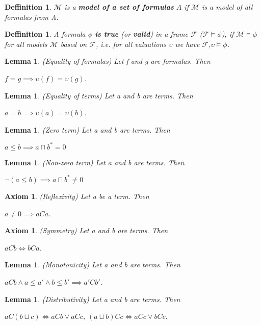 \documentclass{article}
\newcommand\M{\mathcal{M}}
\newcommand\F{\mathcal{F}}
\newtheorem{lemma}[theorem]{Lemma}
\newtheorem{axiom}[theorem]{Axiom}
\newtheorem{defn}[theorem]{Deffinition}
\begin{document}
	\begin{defn}
		$\M$ is a \textbf{model of a set of formulas} $A$ if $\M$ is a model of all formulas from A.
	\end{defn}

	\begin{defn} A formula $\phi$ \textbf{is \textit{true}} (or \textbf{valid}) in a frame $\F$ ($\F \models \phi$), if $\M \models \phi$ for all models $\M$ based on $\F$, i.e. for all valuations $\upsilon$ we have $\F$,$\upsilon \models \phi$.
	\end{defn}

	\begin{lemma}
		(Equality of formulas) Let f and g are formulas. Then \par $f = g \implies \upsilon(f) = \upsilon(g)$.
	\end{lemma}

	\begin{lemma}
		(Equality of terms) Let a and b are terms. Then \par $a = b \implies \upsilon(a) = \upsilon(b)$.
	\end{lemma}

	\begin{lemma} (Zero term) Let a and b are terms. Then \par $a \leq b \implies a \sqcap b^*=0$
	\end{lemma}

	\begin{lemma} (Non-zero term) Let a and b are terms. Then \par $\neg(a \leq b) \implies a \sqcap b^* \neq 0$
	\end{lemma}

	\begin{axiom}
		(Reflexivity) Let a be a term. Then \par $ a \neq 0 \implies aCa$.
	\end{axiom}

	\begin{axiom}
		(Symmetry) Let a and b are terms. Then \par $aCb \iff bCa$.
	\end{axiom}

	\begin{lemma}
		(Monotonicity) Let a and b are terms. Then \par $aCb \land a \leq a' \land b \leq b' \implies a'Cb'$.
	\end{lemma}

	\begin{lemma}
		(Distributivity) Let a and b are terms. Then \par $aC(b \sqcup c) \iff aCb \lor aCc$, \; $(a \sqcup b)Cc \iff aCc \lor bCc$.
	\end{lemma}
\end{document}
